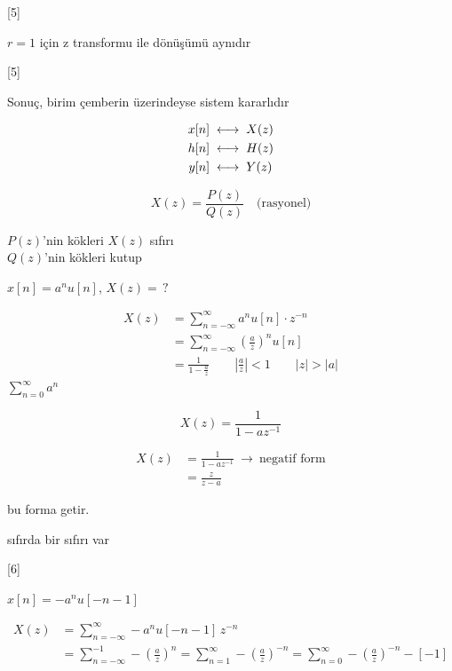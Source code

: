 \documentclass[11pt,a4paper]{article}
\begin{document}
[5]

$r=1$ için z transformu ile  dönüşümü aynıdır

[5]

Sonuç, birim çemberin üzerindeyse sistem kararlıdır

\[ \begin{aligned} x[n] &\;\longleftrightarrow\; X(z) \\ h[n] &\;\longleftrightarrow\; H(z) \\ y[n] &\;\longleftrightarrow\; Y(z) \end{aligned} \]

\[ X(z) = \frac{P(z)}{Q(z)} \quad \text{(rasyonel)} \]

$P(z)$'nin kökleri $X(z)$ sıfırı \\
$Q(z)$'nin kökleri kutup

\begin{ornek}[1]
$x[n]=a^n u[n]$, \quad $X(z)=\,?$
\end{ornek}

\[ \begin{aligned}
X(z) &= \sum_{n=-\infty}^{\infty} a^n u[n]\cdot z^{-n} \\
&= \sum_{n=-\infty}^{\infty} \left(\frac{a}{z}\right)^{n} u[n] \\
&= \frac{1}{1-\frac{a}{z}} \qquad \left|\frac{a}{z}\right|<1 \qquad |z|>|a|
\end{aligned} \]
{\small $\displaystyle\sum_{n=0}^{\infty} a^n$}

\[ X(z) = \frac{1}{1-az^{-1}} \]

\[ \begin{aligned}
X(z) &= \frac{1}{1-az^{-1}} \ \to\ \text{negatif form} \\
&= \frac{z}{z-a}
\end{aligned} \]

\begin{dikkat}
 bu forma getir.
\end{dikkat}

sıfırda bir sıfırı var 

[6]

\begin{ornek}[2]
$x[n] = -a^n u[-n-1]$
\end{ornek}

\[ \begin{aligned}
X(z) &= \sum_{n=-\infty}^{\infty} -a^n u[-n-1]\,z^{-n} \\
&= \sum_{n=-\infty}^{-1} -\left(\frac{a}{z}\right)^{n} = \sum_{n=1}^{\infty} -\left(\frac{a}{z}\right)^{-n} = \sum_{n=0}^{\infty} -\left(\frac{a}{z}\right)^{-n} - [-1]
\end{aligned} \]
\end{document}
